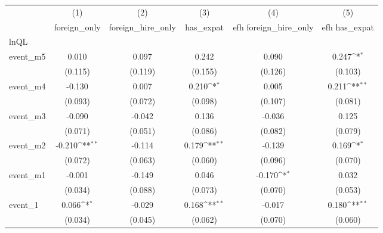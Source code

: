 {
\def\sym#1{\ifmmode^{#1}\else\(^{#1}\)\fi}
\begin{tabular}{l*{5}{c}}
\hline\hline
            &\multicolumn{1}{c}{(1)}&\multicolumn{1}{c}{(2)}&\multicolumn{1}{c}{(3)}&\multicolumn{1}{c}{(4)}&\multicolumn{1}{c}{(5)}\\
            &\multicolumn{1}{c}{foreign\_only}&\multicolumn{1}{c}{foreign\_hire\_only}&\multicolumn{1}{c}{has\_expat}&\multicolumn{1}{c}{efh foreign\_hire\_only}&\multicolumn{1}{c}{efh has\_expat}\\
\hline
lnQL        &                     &                     &                     &                     &                     \\
event\_m5    &       0.010         &       0.097         &       0.242         &       0.090         &       0.247\sym{*}  \\
            &     (0.115)         &     (0.119)         &     (0.155)         &     (0.126)         &     (0.103)         \\
[1em]
event\_m4    &      -0.130         &       0.007         &       0.210\sym{*}  &       0.005         &       0.211\sym{**} \\
            &     (0.093)         &     (0.072)         &     (0.098)         &     (0.107)         &     (0.081)         \\
[1em]
event\_m3    &      -0.090         &      -0.042         &       0.136         &      -0.036         &       0.125         \\
            &     (0.071)         &     (0.051)         &     (0.086)         &     (0.082)         &     (0.079)         \\
[1em]
event\_m2    &      -0.210\sym{**} &      -0.114         &       0.179\sym{**} &      -0.139         &       0.169\sym{*}  \\
            &     (0.072)         &     (0.063)         &     (0.060)         &     (0.096)         &     (0.070)         \\
[1em]
event\_m1    &      -0.001         &      -0.149         &       0.046         &      -0.170\sym{*}  &       0.032         \\
            &     (0.034)         &     (0.088)         &     (0.073)         &     (0.070)         &     (0.053)         \\
[1em]
event\_1     &       0.066\sym{*}  &      -0.029         &       0.168\sym{**} &      -0.017         &       0.180\sym{**} \\
            &     (0.034)         &     (0.045)         &     (0.062)         &     (0.070)         &     (0.060)         \\

\end{tabular}}
